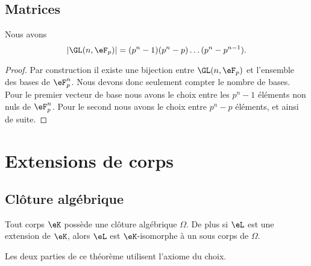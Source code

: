 
\subsection{Matrices}

\begin{proposition}
    Nous avons
    \begin{equation}
        | \GL(n,\eF_p) |=(p^n-1)(p^n-p)\ldots (p^n-p^{n-1}).
    \end{equation}
\end{proposition}

\begin{proof}
    Par construction il existe une bijection entre \( \GL(n,\eF_p)\) et l'ensemble des bases de \( \eF_p^n\). Nous devons donc seulement compter le nombre de bases. Pour le premier vecteur de base nous avons le choix entre les \( p^n-1\) éléments non nuls de \( \eF_p^n\). Pour le second nous avons le choix entre \( p^n-p\) éléments, et ainsi de suite.
\end{proof}

\section{Extensions de corps}

\subsection{Clôture algébrique}

\begin{theorem}
    Tout corps \( \eK\) possède une clôture algébrique \( \Omega\). De plus si \( \eL\) est une extension de \( \eK\), alors \( \eL\) est \( \eK\)-isomorphe à un sous corps de \( \Omega\).
\end{theorem}
Les deux parties de ce théorème utilisent l'axiome du choix.

